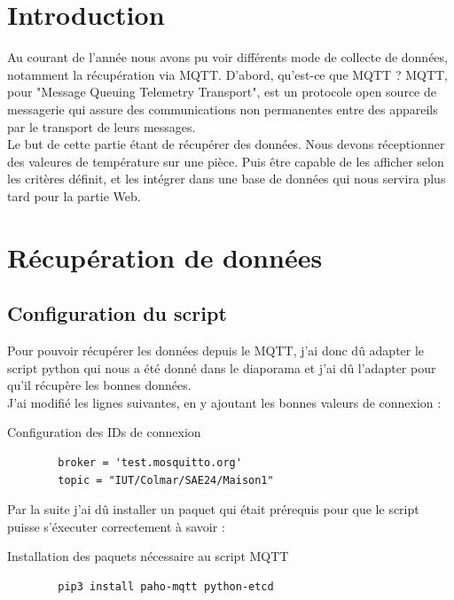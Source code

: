 \documentclass[12pt, a4paper]{article}
\begin{document}
\newpage

\section{Introduction}
Au courant de l'année nous avons pu voir différents mode de collecte de
données, notamment la récupération via MQTT. D'abord, qu'est-ce que MQTT ?
MQTT, pour "Message Queuing Telemetry Transport", est un protocole
open source de messagerie qui assure des communications non permanentes
entre des appareils par le transport de leurs messages.\\
Le but de cette partie étant de récupérer des données. Nous devons réceptionner
des valeures de température sur une pièce. Puis être capable de
les afficher selon les critères définit, et les intégrer dans une base de
données qui nous servira plus tard pour la partie Web. 
	\section{Récupération de données}
		\subsection{Configuration du script}
		Pour pouvoir récupérer les données depuis le MQTT, j'ai donc dû
		adapter le script python qui nous a été donné dans le diaporama
		et j'ai dû l'adapter pour qu'il récupère les bonnes données.\\ 
		J'ai modifié les lignes suivantes, en y ajoutant les bonnes valeurs
		de connexion :
		\begin{listing}[H]
			\caption{Configuration des IDs de connexion}
			\label{lst:id}
			\begin{verbatim}
		broker = 'test.mosquitto.org'
		topic = "IUT/Colmar/SAE24/Maison1"
			\end{verbatim}
		\end{listing}
		Par la suite j'ai dû installer un paquet qui était prérequis 
		pour que le script puisse s'éxecuter correctement à savoir :
		\begin{listing}[H]
			\caption{Installation des paquets nécessaire au script MQTT}
			\label{lst:paho}
			\begin{verbatim}
		pip3 install paho-mqtt python-etcd
			\end{verbatim}
		\end{listing}
		\newpage
\end{document}
